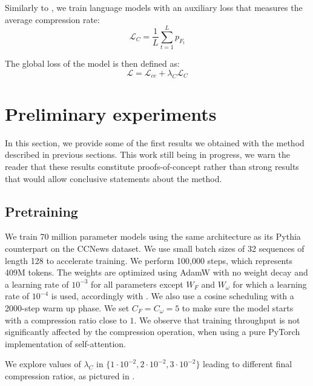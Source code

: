 Similarly to \citet{nawrot2024dynamic}, we train language models with an auxiliary loss that measures the average compression rate:
$$
\mathcal{L}_C = \frac{1}{L} \sum_{t=1}^L p_{F_t}
$$

The global loss of the model is then defined as:
$$
\mathcal{L} = \mathcal{L}_{ce} + \lambda_{C} \mathcal{L}_C
$$


\section{Preliminary experiments}

In this section, we provide some of the first results we obtained with the method described in previous sections. This work still being in progress, we warn the reader that these results constitute proofs-of-concept rather than strong results that would allow conclusive statements about the method.

\subsection{Pretraining}

We train 70 million parameter models using the same architecture as its Pythia counterpart \citep{pythia} on the CCNews \citep{Hamborg2017} dataset. We use small batch sizes of 32 sequences of length 128 to accelerate training. We perform 100,000 steps, which represents 409M tokens. The weights are optimized using AdamW with no weight decay and a learning rate of $10^{-3}$ for all parameters except $W_F$ and $W_\omega$ for which a learning rate of $10^{-4}$ is used, accordingly with . We also use a cosine scheduling with a 2000-step warm up phase. We set $C_F = C_\omega = 5$ to make sure the model starts with a compression ratio close to $1$. We observe that training throughput is not significantly affected by the compression operation, when using a pure PyTorch implementation of self-attention.

We explore values of $\lambda_C$ in $\{1 \cdot 10^{-2}, 2 \cdot 10^{-2}, 3 \cdot 10^{-2}\}$ leading to different final compression ratios, as pictured in .


